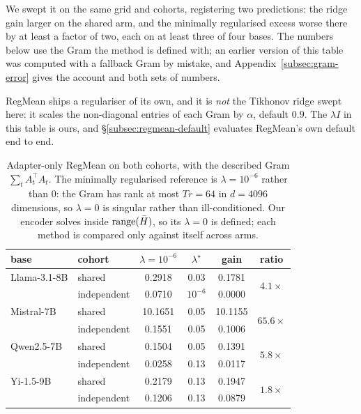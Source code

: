 We swept it on the same grid and cohorts, registering two predictions: the
ridge gain larger on the shared arm, and the minimally regularised excess worse
there by at least a factor of two, each on at least three of four bases. The
numbers below use the Gram the method is defined with; an earlier version of
this table was computed with a fallback Gram by mistake, and
Appendix~\ref{subsec:gram-error} gives the account and both sets of numbers.

RegMean ships a regulariser of its own, and it is \emph{not} the Tikhonov
ridge swept here: it scales the non-diagonal entries of each Gram by
$\alpha$, default $0.9$. The $\lambda I$ in this table is ours, and
\S\ref{subsec:regmean-default} evaluates RegMean's own default end to end.

\begin{table}[t]
\centering
\small
\caption{Adapter-only RegMean on both cohorts, with the described Gram
$\sum_t A_t^\top A_t$. The minimally regularised reference is
$\lambda = 10^{-6}$ rather than $0$: the Gram has rank at most $Tr = 64$ in
$d = 4096$ dimensions, so $\lambda = 0$ is singular rather than
ill-conditioned. Our encoder solves inside $\operatorname{range}(\bar H)$, so its
$\lambda = 0$ is defined; each method is compared only against itself across
arms.}
\label{tab:regmean}
\begin{tabular}{llcccc}
\toprule
base & cohort & $\lambda = 10^{-6}$ & $\lambda^\star$ & gain & ratio \\
\midrule
Llama-3.1-8B & shared      & 0.2918 & 0.03 & 0.1781 & \multirow{2}{*}{$4.1\times$} \\
             & independent & 0.0710 & $10^{-6}$ & 0.0000 & \\
\addlinespace
Mistral-7B   & shared      & 10.1651 & 0.05 & 10.1155 & \multirow{2}{*}{$65.6\times$} \\
             & independent & 0.1551 & 0.05 & 0.1006 & \\
\addlinespace
Qwen2.5-7B   & shared      & 0.1504 & 0.05 & 0.1391 & \multirow{2}{*}{$5.8\times$} \\
             & independent & 0.0258 & 0.13 & 0.0117 & \\
\addlinespace
Yi-1.5-9B    & shared      & 0.2179 & 0.13 & 0.1947 & \multirow{2}{*}{$1.8\times$} \\
             & independent & 0.1206 & 0.13 & 0.0879 & \\
\bottomrule
\end{tabular}
\end{table}

